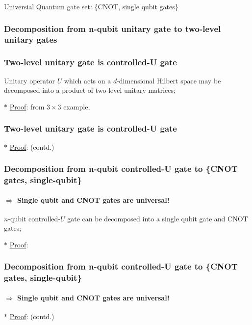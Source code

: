 \documentclass[9pt]{beamer}
\begin{document}
    \begin{section}{Universial Quantum gate set: \{CNOT, single qubit gates\}}
        \begin{frame}
            \frametitle{Decomposition from n-qubit unitary gate to two-level unitary gates}
        
            
        
        \end{frame}
        \begin{frame}
            \frametitle{Two-level unitary gate is controlled-U gate}
                \begin{theorem}\label{thr:two-level de}
                    Unitary operator $U$ which acts on a $d$-dimensional Hilbert space may be decomposed into a product of two-level unitary matrices;
                \end{theorem}
                \vspace{0.2cm}
                $\ast$ \underline{Proof}: from $3\times 3$ example,
        
        \end{frame}
        \begin{frame}
            \frametitle{Two-level unitary gate is controlled-U gate}
                $\ast$ \underline{Proof}: (contd.)
        
        \end{frame}

        \begin{frame}
            \frametitle{Decomposition from n-qubit controlled-U gate to \{CNOT gates, single-qubit\}}
            \framesubtitle{$\Rightarrow$ Single qubit and CNOT gates are universal!}
            \begin{theorem}\label{thr:CNOT-single de}
                $n$-qubit controlled-$U$ gate can be decomposed into a single qubit gate and CNOT gates;
            \end{theorem}
            \vspace{0.2cm}
            $\ast$ \underline{Proof}:
        \end{frame}

        \begin{frame}
            \frametitle{Decomposition from n-qubit controlled-U gate to \{CNOT gates, single-qubit\}}
            \framesubtitle{$\Rightarrow$ Single qubit and CNOT gates are universal!}
                $\ast$ \underline{Proof}: (contd.)
        
        \end{frame}



\end{section}
\end{document}
